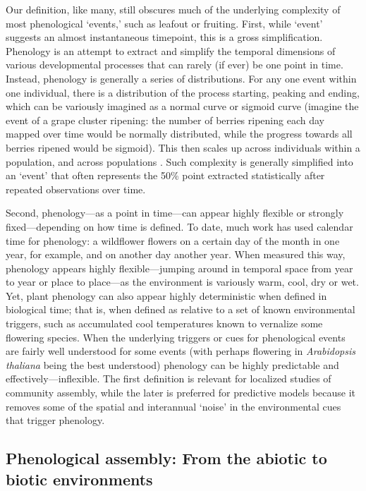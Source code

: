 \documentclass[11pt]{article}
\begin{document}
Our definition, like many, still obscures much of the underlying complexity of most phenological `events,' such as leafout or fruiting. First, while `event' suggests an almost instantaneous timepoint, this is a gross simplification. Phenology is an attempt to extract and simplify the temporal dimensions of various developmental processes that can rarely (if ever) be one point in time. Instead, phenology is generally a series of distributions. For any one event within one individual, there is a distribution of the process starting, peaking and ending, which can be variously imagined as a normal curve or sigmoid curve (imagine the event of a grape cluster ripening: the number of berries ripening each day mapped over time would be normally distributed, while the progress towards all berries ripened would be sigmoid). This then scales up across individuals within a population, and across populations \citep{inouye2019}. Such complexity is generally simplified into an `event' that often represents the 50\% point extracted statistically after repeated observations over time. 

Second, phenology---as a point in time---can appear highly flexible or strongly fixed---depending on how time is defined. To date, much work has used calendar time for phenology: a wildflower flowers on a certain day of the month in one year, for example, and on another day another year. When measured this way, phenology appears highly flexible---jumping around in temporal space from year to year or place to place---as the environment is variously warm, cool, dry or wet. Yet, plant phenology can also appear highly deterministic when defined in biological time; that is, when defined as relative to a set of known environmental triggers, such as accumulated cool temperatures known to vernalize some flowering species. When the underlying triggers or cues for phenological events are fairly well understood for some events (with perhaps flowering in \emph{Arabidopsis thaliana} being the best understood) phenology can be highly predictable and effectively---inflexible. The first definition is relevant for localized studies of community assembly, while the later is preferred for predictive models because it removes some of the spatial and interannual `noise' in the environmental cues that trigger phenology.

\subsection*{Phenological assembly: From the abiotic to biotic environments} 
\end{document}
